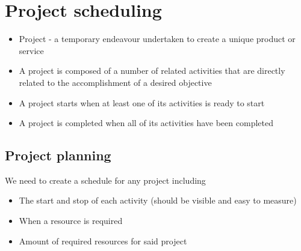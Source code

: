 \documentclass[12pt]{book}
\begin{document}
\section*{Project scheduling}
\begin{itemize}
  \item Project - a temporary endeavour undertaken to create a unique product or service
  \item A project is composed of a number of related activities that are directly related to the accomplishment of a desired objective
  \item A project starts when at least one of its activities is ready to start
  \item A project is completed when all of its activities have been completed
\end{itemize}

\subsection*{Project planning}
We need to create a schedule for any project including
\begin{itemize}
  \item The start and stop of each activity (should be visible and easy to measure)
  \item When a resource is required
  \item Amount of required resources for said project
\end{itemize}

\end{document}
